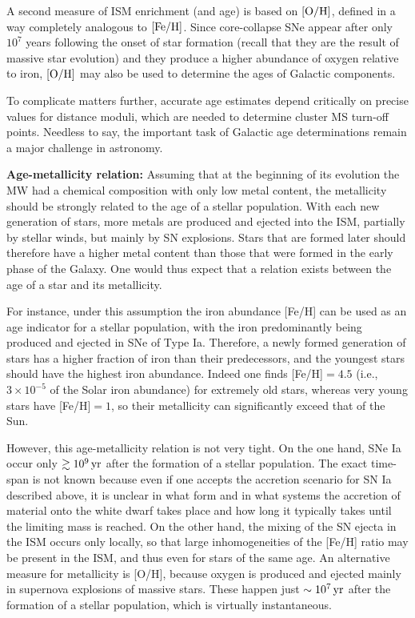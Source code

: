 \documentclass[a4paper,10pt]{article}
\begin{document}
{\noindent}A second measure of ISM enrichment (and age) is based on $[{\rm O/H}]$, defined in a way completely analogous to $[{\rm Fe/H}]$. Since core-collapse SNe appear after only $10^7$ years following the onset of star formation (recall that they are the result of massive star evolution) and they produce a higher abundance of oxygen relative to iron, $[{\rm O/H}]$ may also be used to determine the ages of Galactic components.

{\noindent}To complicate matters further, accurate age estimates depend critically on precise values for distance moduli, which are needed to determine cluster MS turn-off points. Needless to say, the important task of Galactic age determinations remain a major challenge in astronomy.

{\noindent}\textbf{Age-metallicity relation:} Assuming that at the beginning of its evolution the MW had a chemical composition with only low metal content, the metallicity should be strongly related to the age of a stellar population. With each new generation of stars, more metals are produced and ejected into the ISM, partially by stellar winds, but mainly by SN explosions. Stars that are formed later should therefore have a higher metal content than those that were formed in the early phase of the Galaxy. One would thus expect that a relation exists between the age of a star and its metallicity.

{\noindent}For instance, under this assumption the iron abundance [Fe/H] can be used as an age indicator for a stellar population, with the iron predominantly being produced and ejected in SNe of Type Ia. Therefore, a newly formed generation of stars has a higher fraction of iron than their predecessors, and the youngest stars should have the highest iron abundance. Indeed one finds [Fe/H]$=4.5$ (i.e., $3\times10^{-5}$ of the Solar iron abundance) for extremely old stars, whereas very young stars have [Fe/H]$=1$, so their metallicity can significantly exceed that of the Sun.

{\noindent}However, this age-metallicity relation is not very tight. On the one hand, SNe Ia occur only $\gtrsim10^9\,{\rm yr}$ after the formation of a stellar population. The exact time-span is not known because even if one accepts the accretion scenario for SN Ia described above, it is unclear in what form and in what systems the accretion of material onto the white dwarf takes place and how long it typically takes until the limiting mass is reached. On the other hand, the mixing of the SN ejecta in the ISM occurs only locally, so that large inhomogeneities of the [Fe/H] ratio may be present in the ISM, and thus even for stars of the same age. An alternative measure for metallicity is [O/H], because oxygen is produced and ejected mainly in supernova explosions of massive stars. These happen just $\sim10^7\,{\rm yr}$ after the formation of a stellar population, which is virtually instantaneous.
\end{document}
